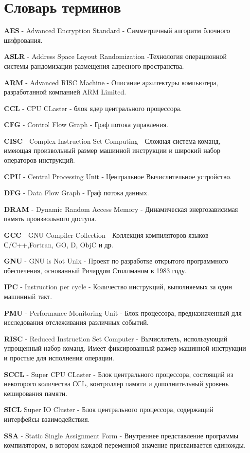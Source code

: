 \chapter*{Словарь терминов}             %

\textbf{AES} - Advanced Encryption Standard  - Симметричный алгоритм блочного шифрования.

\textbf{ASLR} - Address Space Layout Randomization -Технология операционной системы рандомизации размещения адресного пространства.

\textbf{ARM} - Advanced RISC Machine - Описание архитектуры компьютера, разработанной компанией  ARM Limited.

\textbf{CCL} - CPU CLaster - блок ядер центрального процессора.

\textbf{CFG} - Control Flow Graph - Граф потока управления.

\textbf{CISC} - Complex Instruction Set Computing  - Сложная система команд, имеющая произвольный размер машинной инструкции и широкий набор операторов-инструкций.

\textbf{CPU} - Central Processing Unit - Центральное Вычислительное устройство.

\textbf{DFG} - Data Flow Graph  - Граф потока данных.

\textbf{DRAM} - Dynamic Random Access Memory - Динамическая энергозависимая память произвольного доступа.

\textbf{GCC} - GNU Compiler Collection - Коллекция компиляторов языков С/C++,Fortran, GO, D, ObjC и др.

\textbf{GNU} - GNU is Not Unix - Проект по разработке открытого программного обеспечения, основанный Ричардом Столлманом в 1983 году.

\textbf{IPC} - Instruction per cycle - Количество инструкций, выполняемых за один машинный такт. 

\textbf{PMU} - Performance Monitoring Unit - Блок процессора, предназначенный для исследования отслеживания различных событий.

\textbf{RISC} - Reduced Instruction Set Computer -  Вычислитель, использующий упрощенный набор команд. Имеет фиксированный размер машинной инструкции и простые для исполнения операции. 

\textbf{SCCL} - Super CPU CLaster - Блок центрального процессора, состоящий из некоторого количества ССL, контроллер памяти и  дополнительный уровень кеширования памяти.

\textbf{SICL} Super IO Cluster - Блок центрального процессора, содержащий интерфейсы взаимодействия.

\textbf{SSA} - Static Single Assignment Form - Внутреннее представление программы компилятором, в котором каждой переменной значение присваивается единожды.





